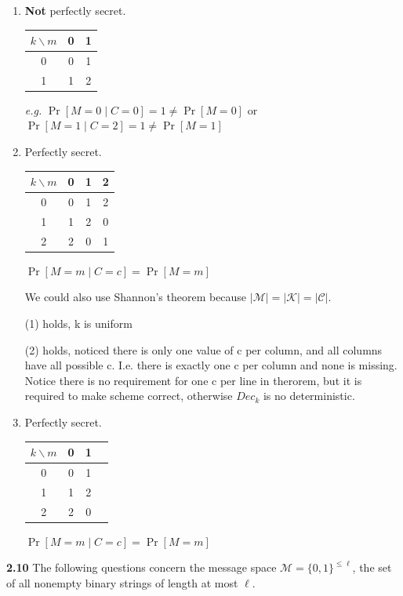 \begin{enumerate}
	\item[(a)] \textbf{Not} perfectly secret.
	
	\begin{tabular}{c|cc}
		$k \backslash m$ & 0 & 1 \\
		\hline
		0 & 0 & 1 \\
		1 & 1 & 2 \\
	\end{tabular}
	
	\textit{e.g.} $\Pr[M = 0 \mid C = 0] = 1  \ne \Pr[M = 0]$ or $\Pr[M = 1 \mid C = 2] = 1  \ne \Pr[M = 1]$
	
	\item[(b)]  Perfectly secret.
	
	\begin{tabular}{c|ccc}
		$k \backslash m$ & 0 & 1  & 2 \\
		\hline
		0 & 0 & 1 & 2 \\
		1 & 1 & 2 & 0 \\
		2 & 2 & 0 & 1 \\
	\end{tabular}
	
	$\Pr[M = m \mid C = c] = \Pr[M = m]$
	
	We could also use Shannon’s theorem because $|\mathcal{M}| = |\mathcal{K}| = |\mathcal{C}|$.
	
	(1) holds, k is uniform
	
	(2) holds, noticed there is only one value of c per column, and all columns have all possible c. I.e. there is exactly one c per column and none is missing. Notice there is no requirement for one c per line in therorem, but it is required to make scheme correct, otherwise $Dec_k$ is no deterministic.
	
	\item[(c)] Perfectly secret.
	
	\begin{tabular}{c|ccc}
		$k \backslash m$ & 0 & 1 \\
		\hline
		0 & 0 & 1 \\
		1 & 1 & 2 \\
		2 & 2 & 0 \\
	\end{tabular}
	
	$\Pr[M = m \mid C = c] = \Pr[M = m]$
	
\end{enumerate}

\newpage
\noindent
\textbf{2.10} \hspace{1em} The following questions concern the message space $\mathcal{M} = \{0,1\}^{\leq \ell}$, the set of all nonempty binary strings of length at most $\ell$.
\vspace{1em}

